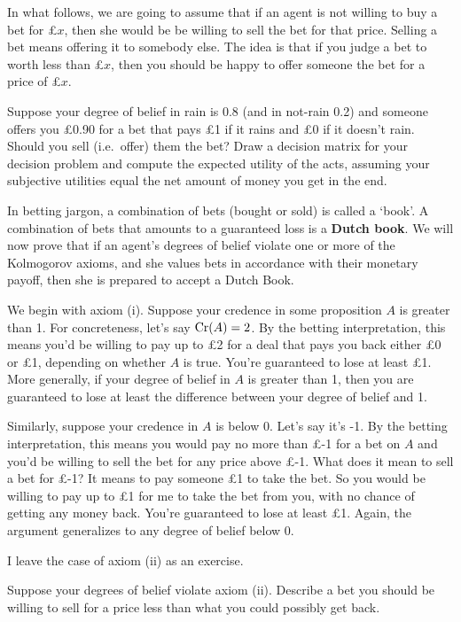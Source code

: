 In what follows, we are going to assume that if an agent is not
willing to buy a bet for £$x$, then she would be be willing to sell
the bet for that price. Selling a bet means offering it to somebody
else. The idea is that if you judge a bet to worth less than £$x$,
then you should be happy to offer someone the bet for a price of £$x$.

\begin{exercise}
  Suppose your degree of belief in rain is $0.8$ (and in not-rain 0.2)
  and someone offers you £0.90 for a bet that pays £1 if it rains and
  £0 if it doesn't rain. Should you sell (i.e.\ offer) them the bet?
  Draw a decision matrix for your decision problem and compute the
  expected utility of the acts, assuming your subjective utilities
  equal the net amount of money you get in the end.
\end{exercise}

In betting jargon, a combination of bets (bought or sold) is called a
`book'. A combination of bets that amounts to a guaranteed loss is a
\textbf{Dutch book}. We will now prove that if an agent's degrees of
belief violate one or more of the Kolmogorov axioms, and she values
bets in accordance with their monetary payoff, then she is prepared to
accept a Dutch Book.

We begin with axiom (i). Suppose your credence in some proposition $A$
is greater than 1. For concreteness, let's say $\text{Cr}(A)=2$. By the
betting interpretation, this means you'd be willing to pay up to £2
for a deal that pays you back either £0 or £1, depending on whether
$A$ is true. You're guaranteed to lose at least £1. More generally, if
your degree of belief in $A$ is greater than 1, then you are
guaranteed to lose at least the difference between your degree of
belief and 1.

Similarly, suppose your credence in $A$ is below 0. Let's say it's
-1. By the betting interpretation, this means you would pay no more
than £-1 for a bet on $A$ and you'd be willing to sell the bet for any
price above £-1. What does it mean to sell a bet for £-1?  It means to
pay someone £1 to take the bet. So you would be willing to pay up to
£1 for me to take the bet from you, with no chance of getting any
money back. You're guaranteed to lose at least £1. Again, the argument
generalizes to any degree of belief below 0.

I leave the case of axiom (ii) as an exercise.

\begin{exercise}
  Suppose your degrees of belief violate axiom (ii). Describe a bet
  you should be willing to sell for a price less than what you could
  possibly get back.
\end{exercise}

